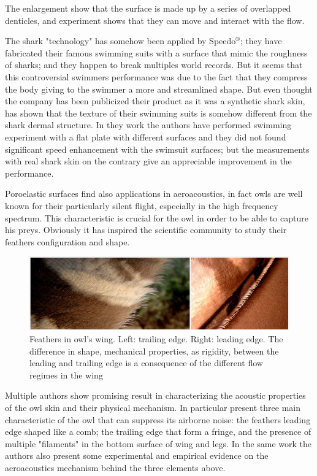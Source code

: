 The enlargement show that the surface is made up by a series of overlapped denticles, and experiment shows that they can move and interact with the flow.

The shark "technology" has somehow been applied by Speedo$^{\circledR}$; they have fabricated their famous swimming suits with a surface that mimic the roughness of sharks; and they happen to break multiples world records.
But it seems that this controversial swimmers performance was due to the fact that they compress the body giving to the swimmer a more and streamlined shape.
But even thought the company has been publicized their product as it was a synthetic shark skin, \citet{Oeffner785} has shown that the texture of their swimming suits is somehow different from the shark dermal structure.
In they work the authors have performed swimming experiment with a flat plate with different surfaces and they did not found significant speed enhancement with the swimsuit surfaces; but the measurements with real shark skin on the contrary give an appreciable improvement in the performance.


Poroelastic surfaces find also applications in aeroacoustics, in fact owls are well known for their particularly silent flight, especially in the high frequency spectrum.
This characteristic is crucial for the owl in order to be able to capture his preys.
Obviously it has inspired the scientific community to study their feathers configuration and shape.

\begin{figure}[h]
	\centering
	\includegraphics[width=0.8\linewidth]{chapter_1/howl}
	\caption{Feathers in owl's wing. Left: trailing edge. Right: leading edge. The difference in shape, mechanical properties, as rigidity, between the leading and trailing edge is a consequence of the different flow regimes in the wing}
	\label{fig:owl}
\end{figure}
 
Multiple authors show promising result in characterizing the acoustic properties of the owl skin and their physical mechanism.
In particular \citet{lilley1998} present three main characteristic of the owl that can suppress its airborne noise: the feathers leading edge shaped like a comb; the trailing edge that form a fringe, and the presence of multiple "filaments" in the bottom surface of wing and legs.
In the same work the authors also present some experimental and empirical evidence on the aeroacoustics mechanism behind the three elements above.

